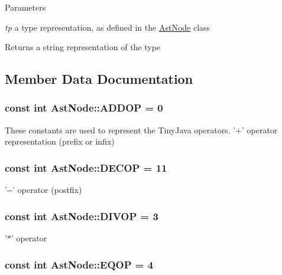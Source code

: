\begin{DoxyParams}{Parameters}
\item[{\em tp}]a type representation, as defined in the \hyperlink{classAstNode}{AstNode} class\end{DoxyParams}
\begin{DoxyReturn}{Returns}
a string representation of the type 
\end{DoxyReturn}


\subsection{Member Data Documentation}
\hypertarget{classAstNode_af908b13b6954116a438f86ce595d5bfe}{
\subsubsection[{ADDOP}]{\setlength{\rightskip}{0pt plus 5cm}const int {\bf AstNode::ADDOP} = 0}}
\label{classAstNode_af908b13b6954116a438f86ce595d5bfe}
These constants are used to represent the TinyJava operators. '+' operator representation (prefix or infix) \hypertarget{classAstNode_a0a48e47b23689fb51c059cb48a007adc}{
\subsubsection[{DECOP}]{\setlength{\rightskip}{0pt plus 5cm}const int {\bf AstNode::DECOP} = 11}}
\label{classAstNode_a0a48e47b23689fb51c059cb48a007adc}
'-\/-\/' operator (postfix) \hypertarget{classAstNode_a3972892cd58f1c70c84366804bdfd371}{
\subsubsection[{DIVOP}]{\setlength{\rightskip}{0pt plus 5cm}const int {\bf AstNode::DIVOP} = 3}}
\label{classAstNode_a3972892cd58f1c70c84366804bdfd371}
'$\ast$' operator \hypertarget{classAstNode_a9cb6a842a496aed85756aa779789ce77}{
\subsubsection[{EQOP}]{\setlength{\rightskip}{0pt plus 5cm}const int {\bf AstNode::EQOP} = 4}}
